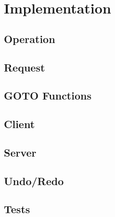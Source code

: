 
\section{Implementation}

\subsection{Operation}

\subsection{Request}

\subsection{GOTO Functions}

\subsection{Client}

\subsection{Server}

\subsection{Undo/Redo}

\subsection{Tests}